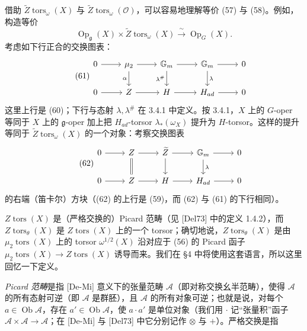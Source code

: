 借助 $\widetilde{Z}\operatorname{tors}_{\omega}(X)$ 与 $\widetilde{Z}\operatorname{tors}_{\omega}(\mathcal{O})$，可以容易地理解等价 (57) 与 (58)。例如，构造等价
\[
  \operatorname{Op}_{\mathfrak{g}}(X)\times\widetilde{Z}\operatorname{tors}_{\omega}(X)\xrightarrow{\ \sim\ }\operatorname{Op}_{G}(X).
\]
考虑如下行正合的交换图表：
\begin{equation}\tag{61}
  \begin{tikzcd}
    0\arrow[r] & \mu_{2}\arrow[r]\arrow[d, "\alpha"'] & \mathbb{G}_{m}\arrow[r]\arrow[d, "\lambda^{\#}"'] & \mathbb{G}_{m}\arrow[r]\arrow[d, "\lambda"] & 0\\
    0\arrow[r] & Z\arrow[r] & H\arrow[r] & H_{ad}\arrow[r] & 0
  \end{tikzcd}
\end{equation}
这里上行是 (60)；下行与态射 $\lambda,\lambda^{\#}$ 在 3.4.1 中定义。按 3.4.1，$X$ 上的 $G$-oper 等同于 $X$ 上的 $\mathfrak{g}$-oper 加上把 $H_{ad}$-torsor $\lambda_{*}(\omega_{X})$ 提升为 $H$-torsor。这样的提升等同于 $\widetilde{Z}\operatorname{tors}_{\omega}(X)$ 的一个对象：考察交换图表
\begin{equation}\tag{62}
  \begin{tikzcd}
    0\arrow[r] & Z\arrow[r]\arrow[d, equal] & \widetilde{Z}\arrow[r]\arrow[d] & \mathbb{G}_{m}\arrow[r]\arrow[d, "\lambda"] & 0\\
    0\arrow[r] & Z\arrow[r] & H\arrow[r] & H_{ad}\arrow[r] & 0
  \end{tikzcd}
\end{equation}
的右端（笛卡尔）方块（(62) 的上行是 (59)，而 (62) 与 (61) 的下行相同）。

 $Z\operatorname{tors}(X)$ 是（严格交换的）Picard 范畴（见 [Del73] 中的定义 1.4.2），而 $Z\operatorname{tors}_{\theta}(X)$ 是 $Z\operatorname{tors}(X)$ 上的一个 torsor；确切地说，$Z\operatorname{tors}_{\theta}(X)$ 是由 $\mu_{2}\operatorname{tors}(X)$ 上的 torsor $\omega^{1/2}(X)$ 沿对应于 (56) 的 Picard 函子 $\mu_{2}\operatorname{tors}(X)\to Z\operatorname{tors}(X)$ 诱导而来。我们在 §4 中将使用这套语言，所以这里回忆一下定义。

\emph{Picard 范畴}是指 [De-Mi] 意义下的张量范畴 $\mathcal{A}$（即对称交换幺半范畴），使得 $\mathcal{A}$ 的所有态射可逆（即 $\mathcal{A}$ 是群胚），且 $\mathcal{A}$ 的所有对象可逆；也就是说，对每个 $a\in\operatorname{Ob}\mathcal{A}$，存在 $a'\in\operatorname{Ob}\mathcal{A}$，使 $a\cdot a'$ 是单位对象（我们用 $\cdot$ 记“张量积”函子 $\mathcal{A}\times\mathcal{A}\to\mathcal{A}$；在 [De-Mi] 与 [Del73] 中它分别记作 $\otimes$ 与 $+$）。严格交换是指

